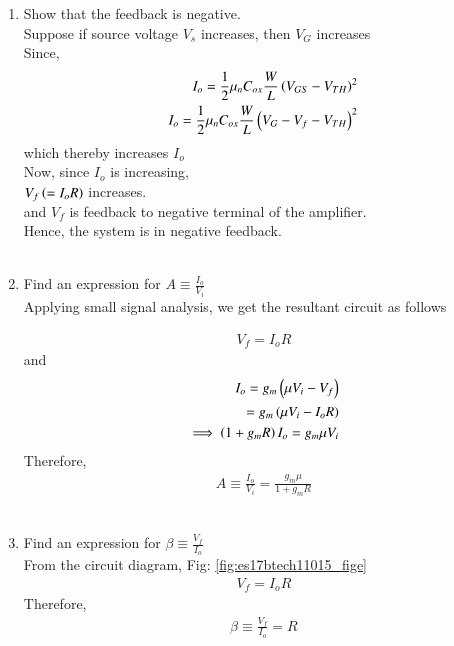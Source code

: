 \begin{enumerate}[label=\arabic*.,ref=\theenumi]
\item Show that the feedback is negative.\\
\solution 
Suppose if source voltage $V_s$ increases, then $V_G$ increases\\
Since,\\
\begin{align}
I_o = \frac{1}{2}\mu_nC_{ox}\frac{W}{L}\left(V_{GS}-V_{TH}\right)^2\\
    I_o = \frac{1}{2}\mu_nC_{ox}\frac{W}{L}\left(V_G-V_f-V_{TH}\right)^2
\end{align}
which thereby increases $I_o$\\

Now, since $I_o$ is increasing, \\
$V_f\left(=I_oR\right)$ increases.\\
and $V_f$ is feedback to negative terminal of the amplifier.\\
Hence, the system is in negative feedback.\\
\\

\item Find an expression for $A \equiv \frac{I_o}{V_i}$\\
\solution  Applying small signal analysis, we get the resultant circuit as follows 
\begin{figure}[ht!]
	\begin{center}
	    \resizebox{\columnwidth/1}{!}{}
	\end{center}
	\caption{}
	\label{fig:es17btech11015_fig2}
\end{figure}
\begin{align}
    V_f = I_oR
\end{align}
and 
\begin{align}
    I_o = g_m\left(\mu V_i-V_f\right)\\
= g_m\left(\mu V_i-I_oR\right)\\
\implies \left(1+g_mR\right)I_o = g_m\mu V_i
\end{align}
Therefore,\begin{align}
   A \equiv \frac{I_o}{V_i} = \frac{g_m\mu}{1+g_mR}
\end{align}\\

\item Find an expression for $\beta \equiv \frac{V_f}{I_o}$
\\
\solution 
From the circuit diagram, Fig: \ref{fig:es17btech11015_fige}
\begin{align}
    V_f = I_oR
\end{align}
Therefore,\begin{align}
    \beta \equiv \frac{V_f}{I_o} = R
\end{align}\\


\end{enumerate}
